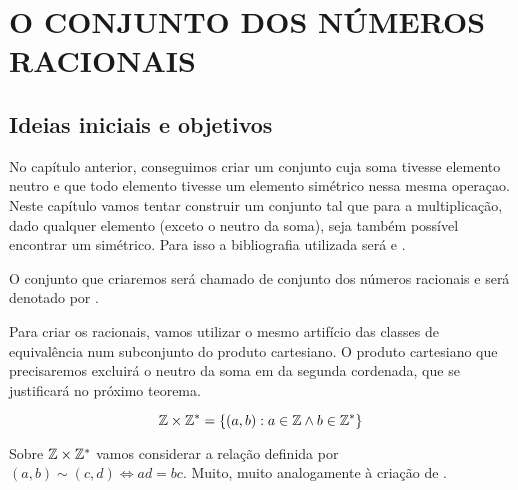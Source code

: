 \documentclass[../main.tex]{subfiles}
\begin{document}
\chapter{O CONJUNTO DOS NÚMEROS RACIONAIS}
\section{Ideias iniciais e objetivos}

No capítulo anterior, conseguimos criar um conjunto \Z cuja soma tivesse elemento neutro e que todo elemento tivesse um elemento simétrico nessa mesma operaçao. Neste capítulo vamos tentar construir um conjunto tal que para a multiplicação, dado qualquer elemento (exceto o neutro da soma), seja também possível encontrar um simétrico. Para isso a bibliografia utilizada será \parencite{domingues-2009} e \parencite{ferreira}.

O conjunto que criaremos será chamado de conjunto dos números racionais e será denotado por \Q.

Para criar os racionais, vamos utilizar o mesmo artifício das classes de equivalência num subconjunto do produto cartesiano. O produto cartesiano que precisaremos excluirá o neutro da soma em \Z da segunda cordenada, que se justificará no próximo teorema.

$$\mathbb{Z} \times \mathbb{Z}^* = \{ \left( a,b \right) : a \in \mathbb{Z} \land b \in \mathbb{Z}^* \}$$

Sobre $\mathbb{Z} \times \mathbb{Z}^*$ vamos considerar a relação definida por $\left( a,b \right) \sim \left( c,d \right) \iff ad = bc$. Muito, muito analogamente à criação de \Z.
\end{document}
